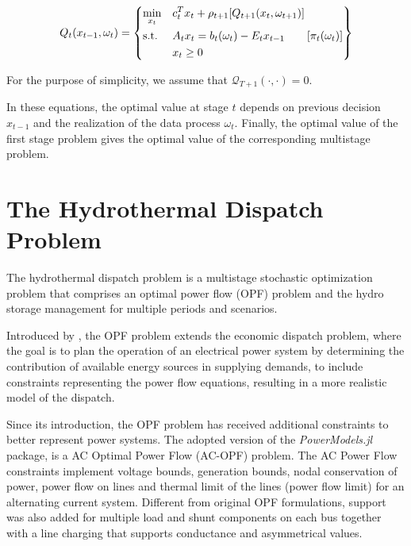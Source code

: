 \documentclass{juliacon}
\begin{document}
 \begin{equation*}
    Q_t(x_{t-1}, \omega_{t}) = \left\{
    \begin{aligned}
    & \underset{x_t}{\text{min}} 
    & & c_t^T x_{t} + \rho_{t+1}[Q_{t+1}(x_{t}, \omega_{t+1})]  \\
    & \text{s.t.} \notag
    & & A_t x_t = b_t(\omega_{t})- E_t x_{t-1} \qquad [\pi_t(\omega_{t})]\\
    & & & x_t \geq 0 \\
    \end{aligned}
    \right\}
\end{equation*}

For the purpose of simplicity, we assume that $\mathcal{Q}_{T+1}(\cdot, \cdot) = 0$.

In these equations, the optimal value at stage $t$ depends on previous decision $x_{t-1}$ and the realization of the data process $\omega_t$. Finally, the optimal value of the first stage problem gives the optimal value of the corresponding multistage problem. 

\section{The Hydrothermal Dispatch Problem}
\label{sec:problemformulation}
%
The hydrothermal dispatch problem is a multistage stochastic optimization problem that comprises an optimal power flow (OPF) problem and the hydro storage management for multiple periods and scenarios. 

Introduced by \cite{carpentier1962contribution}, the OPF problem extends the economic dispatch problem, where the goal is to plan the operation of an electrical power system by determining the contribution of available energy sources in supplying demands, to include constraints representing the power flow equations, resulting in a more realistic model of the dispatch. 

Since its introduction, the OPF problem has received additional constraints to better represent power systems. The adopted version of the \textit{PowerModels.jl} package, is a AC Optimal Power Flow (AC-OPF) problem. The AC Power Flow constraints implement voltage bounds, generation bounds, nodal conservation of power, power flow on lines and thermal limit of the lines (power flow limit) for an alternating current system. Different from original OPF formulations, support was also added for multiple load and shunt components on each bus together with a line charging that supports conductance and asymmetrical values.
\end{document}
